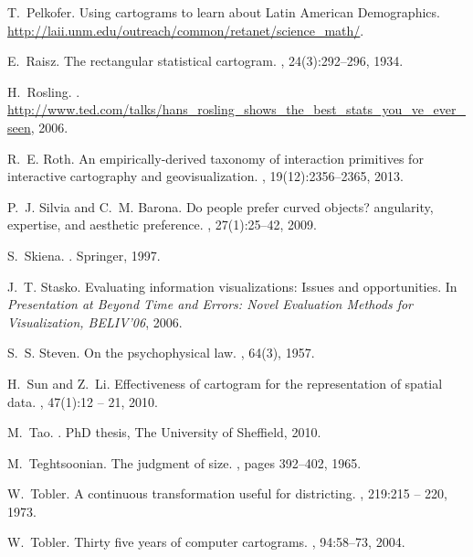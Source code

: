 \documentclass[10pt,journal,compsoc]{IEEEtran}
\begin{document}
\begin{thebibliography}{10}
T.~Pelkofer.
\newblock Using cartograms to learn about {Latin American Demographics}.
\newblock \url{http://laii.unm.edu/outreach/common/retanet/science_math/}.

E.~Raisz.
\newblock The rectangular statistical cartogram.
, 24(3):292--296, 1934.

H.~Rosling.
.
\newblock
  \url{http://www.ted.com/talks/hans_rosling_shows_the_best_stats_you_ve_ever_seen},
  2006.

R.~E. Roth.
\newblock An empirically-derived taxonomy of interaction primitives for
  interactive cartography and geovisualization.
,
  19(12):2356--2365, 2013.

P.~J. Silvia and C.~M. Barona.
\newblock Do people prefer curved objects? angularity, expertise, and aesthetic
  preference.
, 27(1):25--42, 2009.

S.~Skiena.
.
\newblock Springer, 1997.

J.~T. Stasko.
\newblock Evaluating information visualizations: Issues and opportunities.
\newblock In {\em Presentation at Beyond Time and Errors: Novel Evaluation
  Methods for Visualization, {BELIV'06}}, 2006.

S.~S. Steven.
\newblock On the psychophysical law.
, 64(3), 1957.

H.~Sun and Z.~Li.
\newblock Effectiveness of cartogram for the representation of spatial data.
, 47(1):12 -- 21, 2010.

M.~Tao.
.
\newblock PhD thesis, The University of Sheffield, 2010.

M.~Teghtsoonian.
\newblock The judgment of size.
, pages 392--402, 1965.

W.~Tobler.
\newblock A continuous transformation useful for districting.
, 219:215 -- 220, 1973.

W.~Tobler.
\newblock Thirty five years of computer cartograms.
, 94:58--73,
  2004.


\end{thebibliography}
\end{document}
